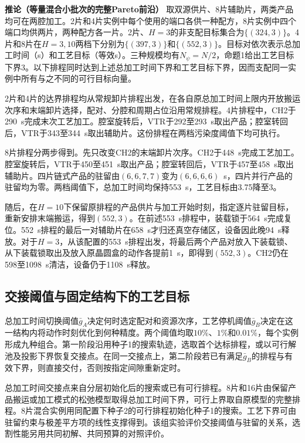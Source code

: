 \documentclass[final,5p,times,twocolumn]{elsarticle}
\begin{document}
\noindent\textbf{推论（等量混合小批次的完整Pareto前沿）}\quad
取双源供片、8片辅助片，两类产品均可在两腔加工。2片和4片实例中每个使用的端口各供一种配方，8片实例中四个端口均供两片，两种配方各一片。2片、$H=3$的非支配目标集合为$\{(324,3)\}$。4片和8片在$H=3,10$两档下分别为$\{(397,3)\}$和$\{(552,3)\}$。目标对依次表示总加工时间（s）和工艺目标（等效s）。三种规模均有$N_\psi=N/2$，命题1给出工艺目标下界3。以下排程同时达到上述总加工时间下界和工艺目标下界，因而支配同一实例中所有与之不同的可行目标向量。

2片和4片的达界排程均从常规卸片排程出发，在各自原总加工时间上限内开放搬运次序和末端卸片选择，配对、分腔和周期占位沿用常规排程。4片排程中，CH2于290~s完成末次工艺加工。腔室旋转后，VTR于292至293~s取出产品；腔室转回后，VTR于343至344~s取出辅助片。这份排程在两档污染度阈值下均可执行。

8片排程分两步得到。先只改变CH2的末端卸片次序。CH2于448~s完成工艺加工。腔室旋转后，VTR于450至451~s取出产品；腔室转回后，VTR于457至458~s取出辅助片。四片链式产品的驻留由$(6,6,7,7)$变为$(6,6,6,6)$~s，四片并行产品的驻留均为零。两档阈值下，总加工时间均保持553~s，工艺目标由3.75降至3。

随后，在$H=10$下保留原排程的产品供片与加工开始时刻，指定逐片驻留目标，重新安排末端搬运，得到$(552,3)$。在前述553~s排程中，装载锁于564~s完成复位。552~s排程的最后一对辅助片在658~s才归还真空存储区，设备因此晚94~s释放。对于$H=3$，从该配置的553~s排程出发，将最后两个产品对放入下装载锁、从下装载锁取出及放入原晶圆盒的动作各提前1~s，即得到$(552,3)$。CH2仍在598至1098~s清洁，设备仍于1108~s释放。

\subsection{交接阈值与固定结构下的工艺目标}
\label{sec:gap-switch-results-cn}

总加工时间切换阈值$\bar g_A$决定何时选定配对和资源次序，工艺停机阈值$\bar g_B$决定在这一结构内将动作时刻优化到何种精度。两个阈值均取$10\%$、$1\%$和$0.01\%$，每个实例形成九种组合。第一阶段沿用种子1的搜索轨迹，选取首个达标排程，或以可行解池及投影下界恢复交接点。在同一交接点上，第二阶段若已有满足$\bar g_B$的排程与有效下界，则直接交付，否则按指定间隙重新定时。

总加工时间交接点来自分层初始化后的搜索或已有可行排程。8片和16片由保留产品搬运或加工模式的松弛模型取得总加工时间下界，可行上界取自原模型的完整排程。8片混合实例用同配置下种子2的可行排程初始化种子1的搜索。工艺下界可由驻留约束与极差平方项的线性支撑得到。该组实验评价交接阈值与驻留的关系，选割性能另用共同初解、共同预算的对照评价。
\end{document}
